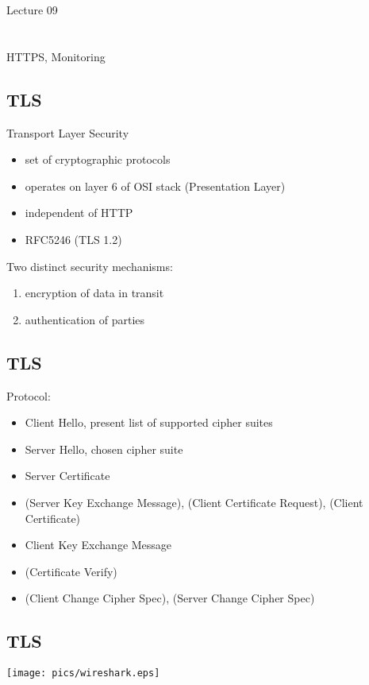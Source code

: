 \documentclass[xga]{xdvislides}
\begin{document}
\newpage
\vspace*{\fill}
\begin{center}
    \Hugesize
        Lecture 09 \\ [1em]
    \hspace*{5mm}
    \blueline\\
    \hspace*{5mm}\\
	HTTPS, Monitoring
\end{center}
\vspace*{\fill}

\subsection{TLS}
Transport Layer Security
\begin{itemize}
	\item set of cryptographic protocols
	\item operates on layer 6 of OSI stack (Presentation Layer)
	\item independent of HTTP
	\item RFC5246 (TLS 1.2)
\end{itemize}
\addvspace{.5in}
Two distinct security mechanisms:
\begin{enumerate}
	\item encryption of data in transit
	\item authentication of parties
\end{enumerate}

\subsection{TLS}
Protocol:
\begin{itemize}
	\item Client Hello, present list of supported cipher suites
	\item Server Hello, chosen cipher suite
	\item Server Certificate
	\item (Server Key Exchange Message), (Client Certificate Request), (Client Certificate)
	\item Client Key Exchange Message
	\item (Certificate Verify)
	\item (Client Change Cipher Spec), (Server Change Cipher Spec)
\end{itemize}

\subsection{TLS}
\begin{center}
	\texttt{[image: pics/wireshark.eps]}
\end{center}
\end{document}
